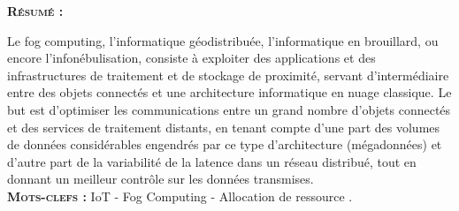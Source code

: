 \large{\textsc{\textbf{Résumé :}}}

Le fog computing, l'informatique géodistribuée, l'informatique en brouillard, ou encore l'infonébulisation, consiste à exploiter des applications et des infrastructures de traitement et de stockage de proximité, servant d'intermédiaire entre des objets connectés et une architecture informatique en nuage classique. Le but est d'optimiser les communications entre un grand nombre d'objets connectés et des services de traitement distants, en tenant compte d'une part des volumes de données considérables engendrés par ce type d'architecture (mégadonnées) et d'autre part de la variabilité de la latence dans un réseau distribué, tout en donnant un meilleur contrôle sur les données transmises.\\

\textsc{\textbf{Mots-clefs :}} IoT - Fog Computing - Allocation de ressource .\\ \\